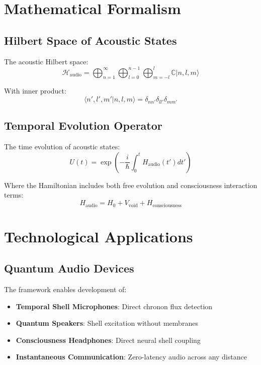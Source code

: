 \documentclass[12pt]{article}
\begin{document}
\section{Mathematical Formalism}

\subsection{Hilbert Space of Acoustic States}

The acoustic Hilbert space:
\begin{equation}
\mathcal{H}_{\text{audio}} = \bigoplus_{n=1}^{\infty} \bigoplus_{l=0}^{n-1} \bigoplus_{m=-l}^{l} \mathbb{C}|n,l,m\rangle
\end{equation}

With inner product:
\begin{equation}
\langle n',l',m' | n,l,m \rangle = \delta_{nn'} \delta_{ll'} \delta_{mm'}
\end{equation}

\subsection{Temporal Evolution Operator}

The time evolution of acoustic states:
\begin{equation}
U(t) = \exp\left(-\frac{i}{\hbar} \int_0^t H_{\text{audio}}(t') dt'\right)
\end{equation}

Where the Hamiltonian includes both free evolution and consciousness interaction terms:
\begin{equation}
H_{\text{audio}} = H_0 + V_{\text{void}} + H_{\text{consciousness}}
\end{equation}

\section{Technological Applications}

\subsection{Quantum Audio Devices}

The framework enables development of:
\begin{itemize}
\item \textbf{Temporal Shell Microphones}: Direct chronon flux detection
\item \textbf{Quantum Speakers}: Shell excitation without membranes
\item \textbf{Consciousness Headphones}: Direct neural shell coupling
\item \textbf{Instantaneous Communication}: Zero-latency audio across any distance
\end{itemize}
\end{document}
